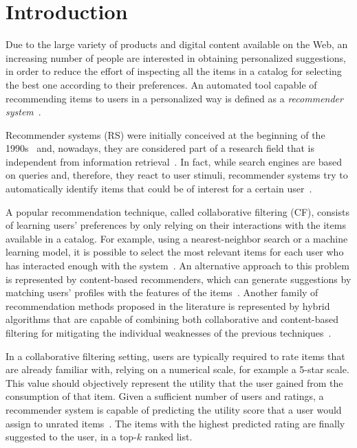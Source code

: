 \chapter{Introduction}
\graphicspath{{Chapter01/Figures/}}

Due to the large variety of products and digital content available on the Web, an increasing number of people are interested in obtaining personalized suggestions, in order to reduce the effort of inspecting all the items in a catalog for selecting the best one according to their preferences. An automated tool capable of recommending items to users in a personalized way is defined as a \textit{recommender system}~\cite{Ricci2015}.

Recommender systems (RS) were initially conceived at the beginning of the 1990s~\cite{Goldberg1992} and, nowadays, they are considered part of a research field that is independent from information retrieval~\cite{Herlocker2000}. In fact, while search engines are based on queries and, therefore, they react to user stimuli, recommender systems try to automatically identify items that could be of interest for a certain user~\cite{Balabanovic1997}.

A popular recommendation technique, called collaborative filtering (CF), consists of learning users' preferences by only relying on their interactions with the items available in a catalog. For example, using a nearest-neighbor search or a machine learning model, it is possible to select the most relevant items for each user who has interacted enough with the system~\cite{Su2009}. An alternative approach to this problem is represented by content-based recommenders, which can generate suggestions by matching users' profiles with the features of the items~\cite{Balabanovic1997,Basu1998}. Another family of recommendation methods proposed in the literature is represented by hybrid algorithms that are capable of combining both collaborative and content-based filtering for mitigating the individual weaknesses of the previous techniques~\cite{Stai2016}.

In a collaborative filtering setting, users are typically required to rate items that are already familiar with, relying on a numerical scale, for example a 5-star scale. This value should objectively represent the utility that the user gained from the consumption of that item. Given a sufficient number of users and ratings, a recommender system is capable of predicting the utility score that a user would assign to unrated items~\cite{Adomavicius2005}. The items with the highest predicted rating are finally suggested to the user, in a top-$k$ ranked list.

